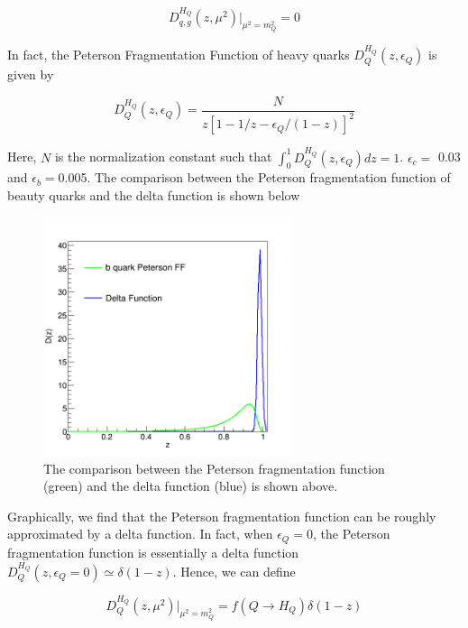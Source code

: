 \begin{equation}
D^{H_Q}_{q,g}(z,\mu^2)|_{\mu^2=m_Q^2} = 0
\end{equation}

In fact, the Peterson Fragmentation Function of heavy quarks $D^{H_Q}_Q(z,\epsilon_Q)$ is given by \cite{Peterson}

\begin{equation}
D^{H_Q}_Q(z,\epsilon_Q) = \frac{N}{z[1-1/z-\epsilon_Q/(1-z)]^2}
\end{equation}

Here, $N$ is the normalization constant such that $\int_0^1 D^{H_Q}_Q(z,\epsilon_Q) dz = 1$. $\epsilon_c = $ 0.03 and $\epsilon_b = $0.005. The comparison between the Peterson fragmentation function of beauty quarks and the delta function is shown below

\begin{figure}[hbtp]
\begin{center}
\includegraphics[width=0.65\textwidth]{Figures/Chapter1/FFPeterson.png}
\caption{The comparison between the Peterson fragmentation function (green) and the delta function (blue) is shown above.}
\label{FONLL}
\end{center}
\end{figure}   


Graphically, we find that the Peterson fragmentation function can be roughly approximated by a delta function. In fact, when $\epsilon_Q = $0, the Peterson fragmentation function is essentially a delta function $D^{H_Q}_{Q}(z,\epsilon_Q = 0) \simeq \delta(1 - z)$. Hence, we can define

\begin{equation}
D^{H_Q}_{Q}(z,\mu^2)|_{\mu^2=m_Q^2} = f(Q \rightarrow H_Q) \delta(1 - z)
\end{equation}

